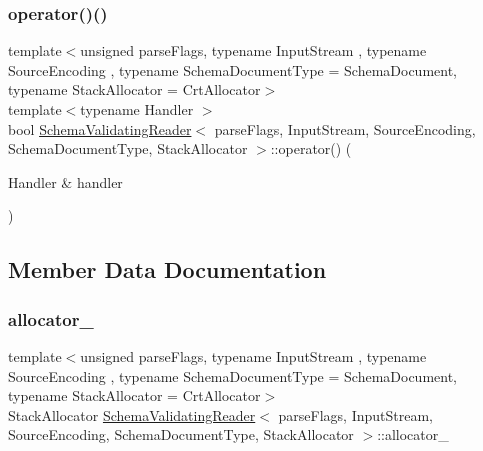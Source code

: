 \subsubsection{\texorpdfstring{operator()()}{operator()()}}
{\footnotesize\ttfamily template$<$unsigned parse\+Flags, typename Input\+Stream , typename Source\+Encoding , typename Schema\+Document\+Type  = Schema\+Document, typename Stack\+Allocator  = Crt\+Allocator$>$ \\
template$<$typename Handler $>$ \\
bool \hyperlink{classSchemaValidatingReader}{Schema\+Validating\+Reader}$<$ parse\+Flags, Input\+Stream, Source\+Encoding, Schema\+Document\+Type, Stack\+Allocator $>$\+::operator() (\begin{DoxyParamCaption}\item[{Handler \&}]{handler }\end{DoxyParamCaption})\hspace{0.3cm}{\ttfamily [inline]}}



\subsection{Member Data Documentation}
\mbox{\label{classSchemaValidatingReader_a7bb53669e646c4a712780c0df55f75a5}} 
\subsubsection{\texorpdfstring{allocator\+\_\+}{allocator\_}}
{\footnotesize\ttfamily template$<$unsigned parse\+Flags, typename Input\+Stream , typename Source\+Encoding , typename Schema\+Document\+Type  = Schema\+Document, typename Stack\+Allocator  = Crt\+Allocator$>$ \\
Stack\+Allocator \hyperlink{classSchemaValidatingReader}{Schema\+Validating\+Reader}$<$ parse\+Flags, Input\+Stream, Source\+Encoding, Schema\+Document\+Type, Stack\+Allocator $>$\+::allocator\+\_\+\hspace{0.3cm}{\ttfamily [private]}}

\mbox{\label{classSchemaValidatingReader_a1d948f949d9f946a03b35301cd6ec9be}} 
